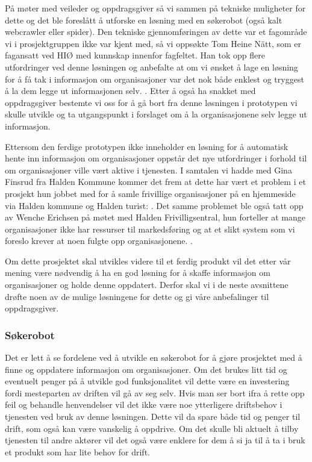 På møter med veileder og oppdragsgiver så vi sammen på tekniske muligheter for dette og det ble foreslått å utforske en løsning med en søkerobot (også kalt webcrawler eller spider). Den tekniske gjennomføringen av dette var et fagområde vi i prosjektgruppen ikke var kjent med, så vi oppsøkte Tom Heine Nätt, som er fagansatt ved HIØ med kunnskap innenfor fagfeltet. Han tok opp flere utfordringer ved denne løsningen og anbefalte at om vi ønsket å lage en løsning for å få tak i informasjon om organisasjoner var det nok både enklest og tryggest å la dem legge ut informasjonen selv. \cite{WEBCRAWLER-SAMTALE:23}. Etter å også ha snakket med oppdragsgiver bestemte vi oss for å gå bort fra denne løsningen i prototypen vi skulle utvikle og ta utgangspunkt i forslaget om å la organisasjonene selv legge ut informasjon.

Ettersom den ferdige prototypen ikke inneholder en løsning for å automatisk hente inn informasjon om organisasjoner oppstår det nye utfordringer i forhold til om organisasjoner ville vært aktive i tjenesten. I samtalen vi hadde med Gina Finsrud fra Halden Kommune kommer det frem at dette har vært et problem i et prosjekt hun jobbet med for å samle frivillige organisasjoner på en hjemmeside via Halden kommune og Halden turist:  \cite{KOMMUNEN-INTERVJU:20}. Det samme problemet ble også tatt opp av Wenche Erichsen på møtet med Halden Frivilligsentral, hun forteller at mange organisasjoner ikke har ressurser til markedsføring og at et slikt system som vi foreslo krever at noen fulgte opp organisasjonene. \cite{FRIVILLIGSENTRALEN-INTERVJU:21}.

Om dette prosjektet skal utvikles videre til et ferdig produkt vil det etter vår mening være nødvendig å ha en god løsning for å skaffe informasjon om organisasjoner og holde denne oppdatert. Derfor skal vi i de neste avsnittene drøfte noen av de mulige løsningene for dette og gi våre anbefalinger til oppdragsgiver.

\subsubsection{Søkerobot}
Det er lett å se fordelene ved å utvikle en søkerobot for å gjøre prosjektet med å finne og oppdatere informasjon om organisasjoner. Om det brukes litt tid og eventuelt penger på å utvikle god funksjonalitet vil dette være en investering fordi mesteparten av driften vil gå av seg selv. Hvis man ser bort ifra å rette opp feil og behandle henvendelser vil det ikke være noe ytterligere driftsbehov i tjenesten ved bruk av denne løsningen. Dette vil da spare både tid og penger til drift, som også kan være vanskelig å oppdrive. Om det skulle bli aktuelt å tilby tjenesten til andre aktører vil det også være enklere for dem å si ja til å ta i bruk et produkt som har lite behov for drift.

